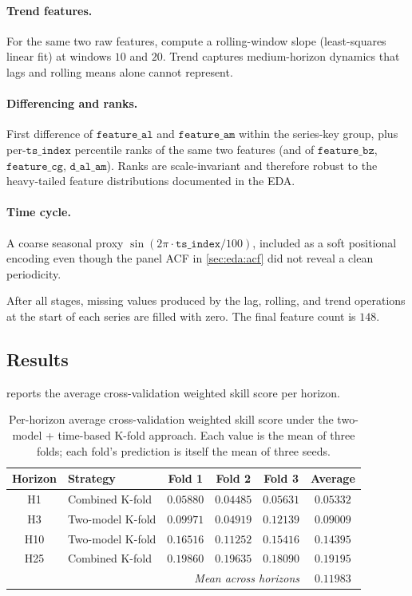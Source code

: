 \paragraph{Trend features.}
For the same two raw features, compute a rolling-window slope (least-squares linear fit) at windows $10$ and $20$. Trend captures medium-horizon dynamics that lags and rolling means alone cannot represent.

\paragraph{Differencing and ranks.}
First difference of $\mathtt{feature\_al}$ and $\mathtt{feature\_am}$ within the series-key group, plus per-$\mathtt{ts\_index}$ percentile ranks of the same two features (and of $\mathtt{feature\_bz}$, $\mathtt{feature\_cg}$, $\mathtt{d\_al\_am}$). Ranks are scale-invariant and therefore robust to the heavy-tailed feature distributions documented in the EDA.

\paragraph{Time cycle.}
A coarse seasonal proxy $\sin(2\pi \cdot \mathtt{ts\_index} / 100)$, included as a soft positional encoding even though the panel ACF in \cref{sec:eda:acf} did not reveal a clean periodicity.

After all stages, missing values produced by the lag, rolling, and trend operations at the start of each series are filled with zero. The final feature count is $148$.

\subsection{Results}
\label{sec:two_model:results}

 reports the average cross-validation weighted skill score per horizon.

\begin{table}[h]
\centering
\caption{Per-horizon average cross-validation weighted skill score under the two-model + time-based K-fold approach. Each value is the mean of three folds; each fold's prediction is itself the mean of three seeds.}
\label{tab:two_model_results}
\begin{tabular}{c l c c c c}
\toprule
Horizon & Strategy & Fold 1 & Fold 2 & Fold 3 & Average \\
\midrule
H1  & Combined K-fold     & $0.05880$ & $0.04485$ & $0.05631$ & $0.05332$ \\
H3  & Two-model K-fold    & $0.09971$ & $0.04919$ & $0.12139$ & $0.09009$ \\
H10 & Two-model K-fold    & $0.16516$ & $0.11252$ & $0.15416$ & $0.14395$ \\
H25 & Combined K-fold     & $0.19860$ & $0.19635$ & $0.18090$ & $0.19195$ \\
\midrule
\multicolumn{5}{r}{\emph{Mean across horizons}} & $\mathbf{0.11983}$ \\
\bottomrule
\end{tabular}
\end{table}

